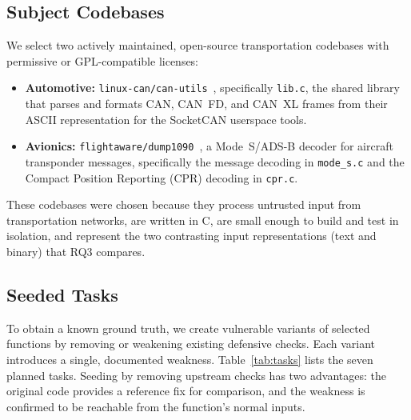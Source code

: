 \documentclass[12pt]{IEEEtran}
\begin{document}
\subsection{Subject Codebases}
We select two actively maintained, open-source transportation codebases with permissive or GPL-compatible licenses:
\begin{itemize}
    \item \textbf{Automotive:} \texttt{linux-can/can-utils}~\cite{canutils}, specifically \texttt{lib.c}, the shared library that parses and formats CAN, CAN~FD, and CAN~XL frames from their ASCII representation for the SocketCAN userspace tools.
    \item \textbf{Avionics:} \texttt{flightaware/dump1090}~\cite{dump1090}, a Mode~S/ADS-B decoder for aircraft transponder messages, specifically the message decoding in \texttt{mode\_s.c} and the Compact Position Reporting (CPR) decoding in \texttt{cpr.c}.
\end{itemize}
These codebases were chosen because they process untrusted input from transportation networks, are written in C, are small enough to build and test in isolation, and represent the two contrasting input representations (text and binary) that RQ3 compares.

\subsection{Seeded Tasks}
To obtain a known ground truth, we create vulnerable variants of selected functions by removing or weakening existing defensive checks. Each variant introduces a single, documented weakness. Table~\ref{tab:tasks} lists the seven planned tasks. Seeding by removing upstream checks has two advantages: the original code provides a reference fix for comparison, and the weakness is confirmed to be reachable from the function's normal inputs.
\end{document}
